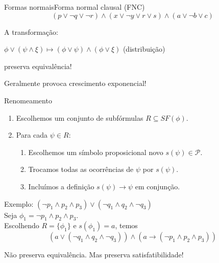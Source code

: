 \begin{frame}{Formas normais}{Forma normal clausal (FNC)}
	$$(p \vee \neg q \vee \neg r) \wedge (x \vee \neg y \vee r \vee s) \wedge (a \vee \neg b \vee c)$$
	
	\pause A transformação:
	\begin{center}
		$\phi \vee (\psi \wedge \xi) \longmapsto (\phi \vee \psi) \wedge (\phi \vee \xi)$ \;\; (distribuição)
	\end{center}
	\pause preserva equivalência!
	
	\vspace{.5cm}
	\pause Geralmente provoca crescimento exponencial!
\end{frame}

\begin{frame}{Renomeamento}
	\begin{enumerate}
		\item Escolhemos um conjunto de subfórmulas $R \subseteq SF(\phi)$.
		\pause\item Para cada $\psi \in R$:
		\begin{enumerate}
			\pause\item Escolhemos um símbolo proposicional novo $s(\psi) \in \mathcal{P}$.
			\pause\item Trocamos todas as ocorrências de $\psi$ por $s(\psi)$.
			\pause\item Incluímos a definição $s(\psi) \rightarrow \psi$ em conjunção.
		\end{enumerate}
	\end{enumerate}
	
	\begin{small}
	\pause Exemplo: $(\neg p_1 \wedge p_2 \wedge p_3) \vee (\neg q_1 \wedge q_2 \wedge \neg q_3)$\\
	\pause Seja $\phi_1 = \neg p_1 \wedge p_2 \wedge p_3$.\\
	\pause Escolhendo $R = \{\phi_1 \}$ e $s(\phi_1) = a$, temos\pause $$(a \vee (\neg q_1 \wedge q_2 \wedge \neg q_3)) \wedge (a \rightarrow (\neg p_1 \wedge p_2 \wedge p_3))$$
	
	\pause Não preserva equivalência. \pause Mas preserva satisfatibilidade!
	\end{small}
\end{frame}

